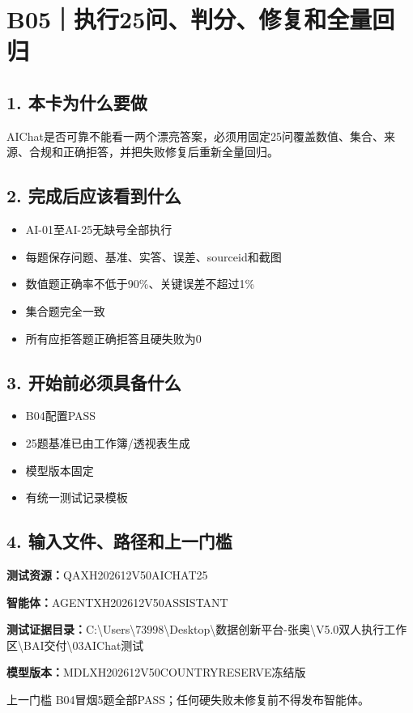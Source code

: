 \documentclass[UTF8,openany,zihao=-4]{ctexbook}
\renewcommand{\_}{\textunderscore\allowbreak}
\begin{document}
\clearpage
\section{B05｜执行25问、判分、修复和全量回归}
\subsection*{1. 本卡为什么要做}
AIChat是否可靠不能看一两个漂亮答案，必须用固定25问覆盖数值、集合、来源、合规和正确拒答，并把失败修复后重新全量回归。


\subsection*{2. 完成后应该看到什么}
\begin{itemize}
\item AI-01至AI-25无缺号全部执行
\item 每题保存问题、基准、实答、误差、source\_id和截图
\item 数值题正确率不低于90\%、关键误差不超过1\%
\item 集合题完全一致
\item 所有应拒答题正确拒答且硬失败为0
\end{itemize}

\subsection*{3. 开始前必须具备什么}
\begin{itemize}[label=$\square$]
\item B04配置PASS
\item 25题基准已由工作簿/透视表生成
\item 模型版本固定
\item 有统一测试记录模板
\end{itemize}

\subsection*{4. 输入文件、路径和上一门槛}
\noindent\textbf{测试资源：}{\promptlatin\promptcjk\small QA\_\allowbreak{}XH202612\_\allowbreak{}V50\_\allowbreak{}AICHAT\_\allowbreak{}25}\par
\noindent\textbf{智能体：}{\promptlatin\promptcjk\small AGENT\_\allowbreak{}XH202612\_\allowbreak{}V50\_\allowbreak{}ASSISTANT}\par
\noindent\textbf{测试证据目录：}{\promptlatin\promptcjk\small C:\textbackslash{}\allowbreak{}Users\textbackslash{}\allowbreak{}73998\textbackslash{}\allowbreak{}Desktop\textbackslash{}\allowbreak{}数据创新平台-\allowbreak{}张奥\textbackslash{}\allowbreak{}V5.0\_\allowbreak{}双人执行工作区\textbackslash{}\allowbreak{}B\_\allowbreak{}AI交付\textbackslash{}\allowbreak{}03\_\allowbreak{}AIChat测试}\par
\noindent\textbf{模型版本：}{\promptlatin\promptcjk\small MDL\_\allowbreak{}XH202612\_\allowbreak{}V50\_\allowbreak{}COUNTRY\_\allowbreak{}RESERVE冻结版}\par
\begin{gatebox}{上一门槛}
B04冒烟5题全部PASS；任何硬失败未修复前不得发布智能体。

\end{gatebox}
\end{document}

